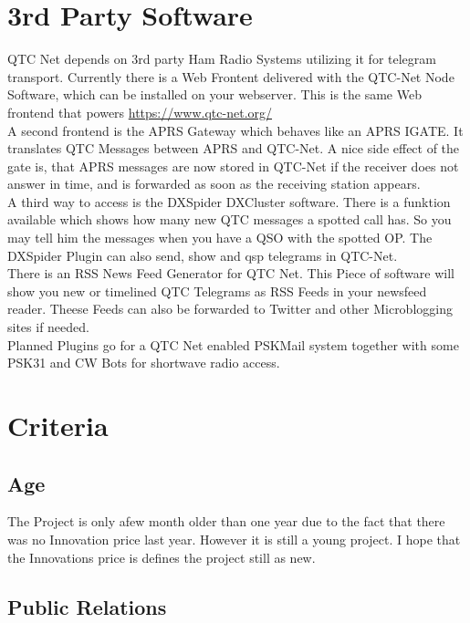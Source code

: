 \documentclass{article}
\begin{document}
\section{3rd Party Software}

QTC Net depends on 3rd party Ham Radio Systems utilizing it for telegram
transport. Currently there is a Web Frontent delivered with the QTC-Net Node
Software, which can be installed on your webserver. This is the same Web
frontend that powers \url{https://www.qtc-net.org/} \\

A second frontend is the APRS Gateway which behaves like an APRS IGATE. It
translates QTC Messages between APRS and QTC-Net. A nice side effect of the
gate is, that APRS messages are now stored in QTC-Net if the receiver does 
not answer in time, and is forwarded as soon as the receiving station 
appears. \\

A third way to access is the DXSpider DXCluster software. There is a funktion 
available which shows how many new QTC messages a spotted call has. So you may
tell him the messages when you have a QSO with the spotted OP. The DXSpider
Plugin can also send, show and qsp telegrams in QTC-Net. \\

There is an RSS News Feed Generator for QTC Net. This Piece of software will 
show you new or timelined QTC Telegrams as RSS Feeds in your newsfeed reader.
Theese Feeds can also be forwarded to Twitter and other Microblogging sites if
needed. \\ 

Planned Plugins go for a QTC Net enabled PSKMail system together with some 
PSK31 and CW Bots for shortwave radio access. 


\section{Criteria}

\subsection{Age}

The Project is only afew month older than one year due to the fact
that there was no Innovation price last year. However it is still a young 
project. I hope that the Innovations price is defines the project still as 
new. 

\subsection{Public Relations}
\end{document}
